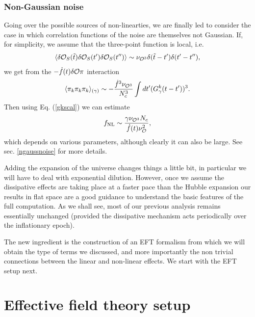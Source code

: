 \documentclass[11pt,amsmath,floats,floatfix,nofootinbib,secnumarabic, superscriptaddress, tightenlines]{revtex4}
\newcommand{\beq}{\begin{equation}}
\newcommand{\eeq}{\end{equation}}
\newcommand{\calo}{{\cal O}}
\begin{document}
{\subsubsection{Non-Gaussian noise}

Going over the possible sources of non-linearties, we are finally led to consider the case in which correlation functions of the noise are themselves not Gaussian. If, for simplicity, we assume that the three-point function is local, i.e.
\beq
\label{ngnoise}
\langle\delta\calo_S(\tilde t)\delta\calo_S(t')\delta\calo_S(t'')\rangle \sim \nu_{\calo^3} \delta(\tilde t-t')\delta(t'-t''),
\eeq
we get from the $-\dot f(t) \delta\calo \pi$ interaction
\beq
\langle \pi_k\pi_k\pi_k \rangle_{(\gamma)} \sim -\frac{\dot f^3 \nu_{\calo^3}}{N_c^3} \int dt' (G^k_\gamma(t-t'))^3.
\eeq
Then using Eq. (\ref{gkscal}) we can estimate
\beq
\label{fnlnoise}
f_{\rm NL} \sim \frac{\gamma\nu_{\calo^3}N_c}{\dot f(t) \nu_{\calo}^2},
\eeq
which depends on various parameters, although clearly it can also be large. See sec. \ref{ngaussnoise} for more details.

\vskip 0.5cm

Adding the expansion of the universe changes things a little bit, in particular we will have to deal with exponential dilution. However, once we assume the dissipative effects are taking place at a faster pace than the Hubble expansion our results in flat space are a good guidance to understand the basic features of the full computation. As we shall see, most of our previous analysis remains essentially unchanged (provided the dissipative mechanism acts periodically over the inflationary epoch). 

The new ingredient is the construction of an EFT formalism from which we will obtain the type of terms we discussed, and more importantly the non trivial connections between the linear and non-linear effects. We start with the EFT setup next.

\section{Effective field theory setup}\label{eftsup}

}
\end{document}
